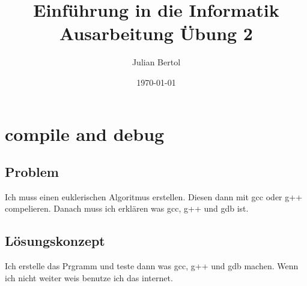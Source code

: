 \documentclass[a4paper,11pt,titlepage]{article}
\begin{document}
\title{Einf\"uhrung in die Informatik\\
Ausarbeitung \"Ubung 2}


\author{Julian Bertol}


\date{\today}

\maketitle{\thispagestyle{plain}}

\section{compile and debug}
\subsection{Problem}
Ich muss einen euklerischen Algoritmus erstellen. Diesen dann mit gcc oder g++ compelieren.\newline
Danach muss ich erkl\"aren was gcc, g++ und gdb ist. \newline
\subsection{L\"osungskonzept}
Ich erstelle das Prgramm und teste dann was gcc, g++ und gdb machen. Wenn ich nicht weiter weis benutze ich das internet. \newline
\end{document}
